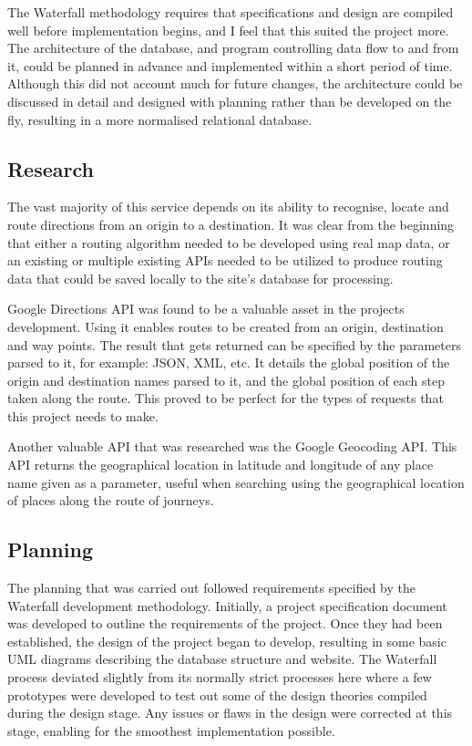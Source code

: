 The Waterfall methodology requires that specifications and design are compiled well before implementation begins, and I feel that this suited the project more. The architecture of the database, and program controlling data flow to and from it, could be planned in advance and implemented within a short period of time. Although this did not account much for future changes, the architecture could be discussed in detail and designed with planning rather than be developed on the fly, resulting in a more normalised relational database.

\subsection{Research}
The vast majority of this service depends on its ability to recognise, locate and route directions from an origin to a destination. It was clear from the beginning that either a routing algorithm needed to be developed using real map data, or an existing or multiple existing APIs needed to be utilized to produce routing data that could be saved locally to the site's database for processing. 

Google Directions API\cite{google_directions_api} was found to be a valuable asset in the projects development. Using it enables routes to be created from an origin, destination and way points. The result that gets returned can be specified by the parameters parsed to it, for example: JSON, XML, etc. It details the global position of the origin and destination names parsed to it, and the global position of each step taken along the route. This proved to be perfect for the types of requests that this project needs to make. 

Another valuable API that was researched was the Google Geocoding API\cite{google_geocoding_api}. This API returns the geographical location in latitude and longitude of any place name given as a parameter, useful when searching using the geographical location of places along the route of journeys.

\subsection{Planning}
The planning that was carried out followed requirements specified by the Waterfall development methodology. Initially, a project specification document was developed to outline the requirements of the project. Once they had been established, the design of the project began to develop, resulting in some basic UML diagrams describing the database structure and website. The Waterfall process deviated slightly from its normally strict processes here where a few prototypes were developed to test out some of the design theories compiled during the design stage. Any issues or flaws in the design were corrected at this stage, enabling for the smoothest implementation possible.


